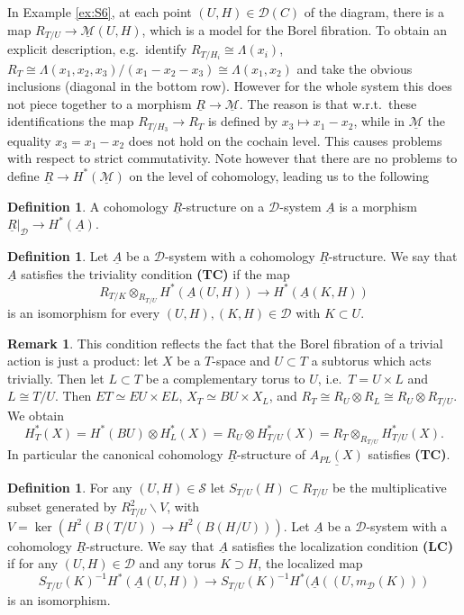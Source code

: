 \documentclass[12pt,a4paper]{article}
\theoremstyle{definition}
\newtheorem{rem}[thm]{Remark}
\newtheorem{defn}[thm]{Definition}
\begin{document}
In Example \ref{ex:S6}, at each point $(U,H)\in \mathcal{D}(C)$ of the diagram, there is a map $R_{T/U}\rightarrow \underline{\mathcal{M}}(U,H)$, which is a model for the Borel fibration. To obtain an explicit description, e.g.\ identify $R_{T/H_i}\cong \Lambda(x_i)$, $R_T\cong \Lambda(x_1,x_2,x_3)/(x_1-x_2-x_3)\cong\Lambda(x_1,x_2)$ and take the obvious inclusions (diagonal in the bottom row). However for the whole system this does not piece together to a morphism $\underline{R}\rightarrow \underline{\mathcal{M}}$. The reason is that w.r.t.\ these identifications the map $R_{T/H_3}\rightarrow R_T$ is defined by $x_3\mapsto x_1-x_2$, while in $\underline{\mathcal{M}}$ the equality $x_3=x_1-x_2$ does not hold on the cochain level. This causes problems with respect to strict commutativity. Note however that there are no problems to define $\underline{R}\rightarrow H^*(\underline{\mathcal{M}})$ on the level of cohomology, leading us to the following

\begin{defn}
A cohomology $\underline{R}$-structure on a $\mathcal{D}$-system $\underline{A}$ is a morphism $\underline{R}|_{\mathcal{D}}\rightarrow H^*(\underline{A})$.
\end{defn}

\begin{defn}
Let $\underline{A}$ be a $\mathcal{D}$-system with a cohomology $\underline{R}$-structure. We say that $\underline{A}$ satisfies the triviality condition \textbf{(TC)} if the map \[R_{T/K}\otimes_{R_{T/{U}}} H^*(\underline{A}(U,H))\rightarrow H^*(\underline{A}(K,H))\] is an isomorphism for every $(U,H),(K,H)\in \mathcal{D}$ with $K\subset U$.
\end{defn}

\begin{rem}\label{rem:TC}
This condition reflects the fact that the Borel fibration of a trivial action is just a product: let $X$ be a $T$-space and $U\subset T$ a subtorus which acts trivially. Then let $L\subset T$ be a complementary torus to $U$, i.e.\ $T=U\times L$ and $L\cong T/U$. Then $ET\simeq EU\times EL$, $X_T\simeq BU\times X_L$, and $R_T\cong R_U\otimes R_L\cong R_U\otimes R_{T/U}$. We obtain \[H_T^*(X)=H^*(BU)\otimes H^*_L(X)= R_U\otimes H_{T/U}^*(X)=R_T\otimes_{R_{T/U}} H_{T/U}^*(X).\]
In particular the canonical cohomology $\underline{R}$-structure of $\underline{A_{PL}(X)}$ satisfies \textbf{(TC)}.
\end{rem}


\begin{defn}
For any $(U,H)\in\mathcal{S}$ let $S_{T/U}(H)\subset R_{T/U}$ be the multiplicative subset generated by $R_{T/U}^2\backslash V$, with $V=\ker (H^2(B(T/U))\rightarrow H^2(B(H/U)))$.
Let $\underline{A}$ be a $\mathcal{D}$-system with a cohomology $\underline{R}$-structure. We say that $\underline{A}$ satisfies the localization condition \textbf{(LC)} if for any $(U,H)\in\mathcal{D}$ and any torus $K\supset H$, the localized map
\[S_{T/U}(K)^{-1}H^*(\underline{A}(U,H))\rightarrow S_{T/U}(K)^{-1} H^*(\underline{A}((U,m_\mathcal{D}(K)))\]
is an isomorphism.
\end{defn}
\end{document}
